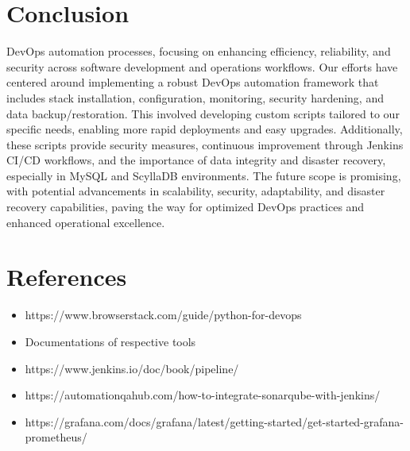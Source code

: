 \documentclass[12pt,a4paper,oneside]{report}
\begin{document}
\newpage
\chapter{Conclusion}
\hspace{20pt}  DevOps automation processes, focusing on enhancing efficiency, reliability, and security across software development and operations workflows. Our efforts have centered around implementing a robust DevOps automation framework that includes stack installation, configuration, monitoring, security hardening, and data backup/restoration. This involved developing custom scripts tailored to our specific needs, enabling more rapid deployments and easy upgrades. Additionally, these scripts provide security measures, continuous improvement through Jenkins CI/CD workflows, and the importance of data integrity and disaster recovery, especially in MySQL and ScyllaDB environments. The future scope is promising, with potential advancements in scalability, security, adaptability, and disaster recovery capabilities, paving the way for optimized DevOps practices and enhanced operational excellence.

\newpage
\chapter{References}
\begin{itemize}
\item{https://www.browserstack.com/guide/python-for-devops}
\item{Documentations of respective tools}
\item{https://www.jenkins.io/doc/book/pipeline/}
\item{https://automationqahub.com/how-to-integrate-sonarqube-with-jenkins/}
\item{https://grafana.com/docs/grafana/latest/getting-started/get-started-grafana-prometheus/}
\end{itemize}
\end{document}
